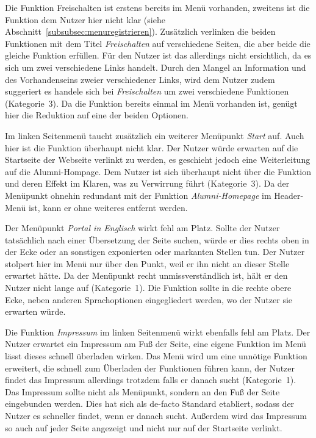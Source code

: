 {Die Funktion Freischalten ist erstens bereits im Menü vorhanden, zweitens ist die Funktion dem Nutzer hier nicht klar (siehe Abschnitt~\ref{subsubsec:menuregistrieren}). 
Zusätzlich verlinken die beiden Funktionen mit dem Titel \emph{Freischalten} auf verschiedene Seiten, die aber beide die gleiche Funktion erfüllen. Für den Nutzer ist das allerdings nicht ersichtlich, da es sich um zwei verschiedene Links handelt.
}
{Durch den Mangel an Information und des Vorhandenseins zweier verschiedener Links, wird dem Nutzer zudem suggeriert es handele sich bei \emph{Freischalten} um zwei verschiedene Funktionen (Kategorie~3).
}
{
Da die Funktion bereits einmal im Menü vorhanden ist, genügt hier die Reduktion auf eine der beiden Optionen.
}\label{prob:start:pkt:frei}

{Im linken Seitenmenü taucht zusätzlich ein weiterer Menüpunkt \emph{Start} auf. Auch hier ist die Funktion überhaupt nicht klar. Der Nutzer würde erwarten auf die Startseite der Webseite verlinkt zu werden, es geschieht jedoch eine Weiterleitung auf die Alumni-Hompage. 
}
{Dem Nutzer ist sich überhaupt nicht über die Funktion und deren Effekt im Klaren, was zu Verwirrung führt (Kategorie~3).
}
{Da der Menüpunkt ohnehin redundant mit der Funktion \emph{Alumni-Homepage} im Header-Menü ist, kann er ohne weiteres entfernt werden.
}\label{prob:start:pkt:start}

{Der Menüpunkt \emph{Portal in Englisch} wirkt fehl am Platz. Sollte der Nutzer tatsächlich nach einer Übersetzung der Seite suchen, würde er dies rechts oben in der Ecke oder an sonstigen exponierten oder markanten Stellen tun. 
Der Nutzer stolpert hier im Menü nur über den Punkt, weil er ihn nicht an dieser Stelle erwartet hätte.
}
{Da der Menüpunkt recht unmissverständlich ist, hält er den Nutzer nicht lange auf (Kategorie~1).
}
{Die Funktion sollte in die rechte obere Ecke, neben anderen Sprachoptionen eingegliedert werden, wo der Nutzer sie erwarten würde.
}\label{prob:start:pkt:eng}

{Die Funktion \emph{Impressum} im linken Seitenmenü wirkt ebenfalls fehl am Platz. Der Nutzer erwartet ein Impressum am Fuß der Seite, eine eigene Funktion im Menü lässt dieses schnell überladen wirken.
}
{Das Menü wird um eine unnötige Funktion erweitert, die schnell zum Überladen der Funktionen führen kann, der Nutzer findet das Impressum allerdings trotzdem falls er danach sucht (Kategorie~1).
}
{Das Impressum sollte nicht als Menüpunkt, sondern an den Fuß der Seite eingebunden werden. Dies hat sich als de-facto Standard etabliert, sodass der Nutzer es schneller findet, wenn er danach sucht.
Außerdem wird das Impressum so auch auf jeder Seite angezeigt und nicht nur auf der Startseite verlinkt. 
}\label{prob:start:pkt:imp}


